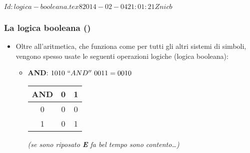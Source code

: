 %
%
%
%
%
\svnInfo $Id: logica-booleana.tex 8 2014-02-04 21:01:21Z nicb $

\setcounter{ms}{0}
\begin{frame}
    \frametitle{La logica booleana ()}

	\begin{itemize}[<+- | alert@+->]

		\item Oltre all'aritmetica, che funziona come per tutti gli altri
		      sistemi di simboli, vengono spesso usate le seguenti
			  operazioni logiche (logica booleana):

			\begin{itemize}[<+- | alert@+->]

				\item {\bfseries AND}: $1010~``AND''~0011 = 0010$
					\hfill
					\begin{tabular}{c | c c}
						AND & 0 & 1\\
						\hline
						0 & 0 & 0\\
						1 & 0 & 1\\
					\end{tabular}

					{\itshape (se sono riposato {\bfseries E}
					fa bel tempo sono contento\ldots)}

				\end{itemize}

	\end{itemize}

\end{frame}

